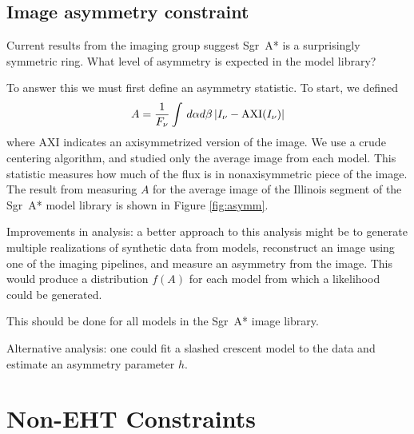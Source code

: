\documentclass[twocolumn,tighten,dvipsnames]{aastex63}
\newcommand\sgra{Sgr~A*\xspace}
\newcommand\<{{\langle}}
\renewcommand\>{{\rangle}} %
\begin{document}
\subsection{Image asymmetry constraint}
\label{sec:asymconst}

Current results from the imaging group suggest \sgra is a surprisingly symmetric ring.   What level of asymmetry is expected in the model library?

To answer this we must first define an asymmetry statistic.  To start, we defined
\begin{equation}
    A = \frac{1}{F_\nu} \int \, d\alpha d\beta \, | I_\nu - {\rm AXI}(I_\nu) |
\end{equation}
where AXI indicates an axisymmetrized version of the image.  We use a crude centering algorithm, and studied only the average image from each model.  This statistic measures how much of the flux is in nonaxisymmetric piece of the image.   The result from measuring $A$ for the average image of the Illinois segment of the \sgra model library is shown in Figure \ref{fig:asymm}.

\begin{figure*}
  \caption{Asymmetry statistic $A$ for models in the \sgra image library.  Lower $A$ is more symmetric.  All models are more symmetric when viewed nearly face on (or anti-face-on).  The $R_{high} = 1$ models exhibit distinct trends and the models will likely be eliminated by other considerations.  For $R_{high} \ge 10$ SANE edge-on models are most asymmetric at high positive spin, while the MAD edge-on models are most asymmetric at moderate negative spin.}
  \label{fig:asymm}
\end{figure*}

Improvements in analysis: a better approach to this analysis might be to generate multiple realizations of synthetic data from models, reconstruct an image using one of the imaging pipelines, and measure an asymmetry from the image.  This would produce a distribution $f(A)$ for each model from which a likelihood could be generated.

This should be done for all models in the \sgra image library.

Alternative analysis: one could fit a slashed crescent model to the data and estimate an asymmetry parameter $h$.

\section{Non-EHT Constraints}
\label{sec:nonehtconst}
\end{document}
